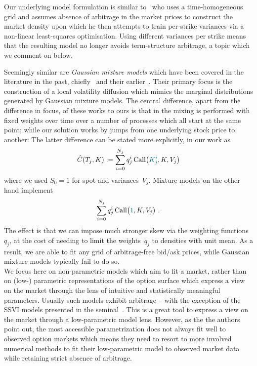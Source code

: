 \documentclass[twoside]{article}
\theoremstyle{plain}
\theoremstyle{definition}
\theoremstyle{remark}
\begin{document}
Our underlying model formulation is similar to~\cite{elalaoui2023}
who uses a time-homogeneous grid and assumes absence of arbitrage in the market prices
to construct the market density upon which he then attempts to train per-strike variances
via a non-linear least-squares optimisation. Using different variances per strike means that 
the resulting model no longer avoids term-structure arbitrage, a topic which we comment on below.

Seemingly similar are \textsl{Gaussian mixture models} which have been covered in the literature in the past, chiefly~\cite{mixedBrigo02}
and their earlier~\cite{mixedBrigo00}. Their primary focus is the construction of a local volatility
diffusion which mimics the marginal distributions generated by Gaussian mixture models.
The central difference, apart from the difference in focus, of these works to ours is that in \cite{mixedBrigo00,mixedBrigo02} the mixing is performed with fixed weights over time over a number of processes which all start at the same point; while our solution works by jumps from one underlying stock price to another:
The latter difference can be stated more explicitly, in our work as
    $$
        \hat C(T_j,K) := \sum_{i=0}^{N_j} q^i_j\, \mathrm{Call}\big({\color{pinegreen} K^i_j},K,V_j\big) 
    $$
where we used $S_0=1$ for spot and variances~$V_j$. Mixture models on the other hand implement
    $$
        \sum_{i=0}^{N_j} q^i_j\, \mathrm{Call}\big({\color{pinegreen} 1},K,V_j\big) \ . 
    $$
The effect is that we can impose much stronger skew via the weighting functions~$q_j$, at the cost
of needing to limit the weights~$q_j$ to densities with unit mean. As a result, we are
able to fit any grid of arbitrage-free bid/ask prices, while Gaussian mixture
models typically fail to do so.\\

We focus here on non-parametric models which aim to fit a market, rather than on (low-) parametric
representations of the option surface which express a view on the market
through the lens of intuitive and statistically meaningful parameters.
Usually such models exhibit arbitrage -- with the exception of the SSVI models
presented in the seminal~\cite{gatheral2014arbitrage}. This is a great tool to express a view on the market
through a low-parametric model lens.
However, as the
the authors point out, the most accessible parametrization
does not always fit well to observed option markets which means they need to resort to more involved
numerical methods to fit their low-parametric model to observed market data while retaining
strict absence of arbitrage.\\
\end{document}
